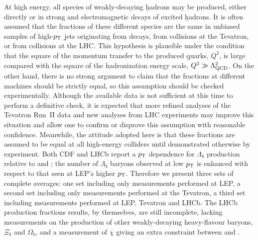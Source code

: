 
At high energy, all species of weakly-decaying \b hadrons 
may be produced, either directly or in strong and electromagnetic 
decays of excited \b hadrons. It is often assumed that the fractions 
of these different species are the same in unbiased samples of 
high-$p_{\rm T}$ \b jets originating from  decays, 
from  collisions at the Tevatron, or from 
 collisions at the LHC.
This hypothesis is plausible under the condition that the square of
the momentum transfer to the produced \b quarks, $Q^2$, is large compared 
with the square of the hadronization energy scale, 
$Q^2 \gg \Lambda_{\rm QCD}^2$.
On the other hand, there is no strong argument to claim that the
fractions at different machines should be strictly equal, so 
this assumption should be checked experimentally. Although the 
available data is not sufficient at this time to perform a definitive
check, it is expected that more refined analyses of the Tevatron Run~II data 
and new analyses from LHC 
experiments may improve this situation and allow one to confirm or 
disprove this assumption with reasonable confidence. Meanwhile, the 
attitude adopted here is that these fractions are assumed to be equal 
at all high-energy colliders until demonstrated otherwise by 
experiment.
Both CDF and LHCb report a $p_{\rm T}$ dependence for $\Lambda_b$
production relative to \Bu and \Bd; the number of $\Lambda_b$ baryons
observed at low $p_{\rm T}$ is enhanced with respect to that 
seen at LEP's higher $p_{\rm T}$.
Therefore we present 
three sets of complete averages: one set including only measurements 
performed at LEP, a second set including only measurements performed 
at the Tevatron, a third  set including measurements performed at LEP, 
Tevatron and LHCb.  The LHCb production fractions results, by themselves, 
are still incomplete, lacking measurements on the production of other
weakly-decaying heavy-flavour baryons, $\Xi_b$ and $\Omega_b$, and a measurement of 
$\overline{\chi}$ giving an extra constraint between \fBd and \fBs.

